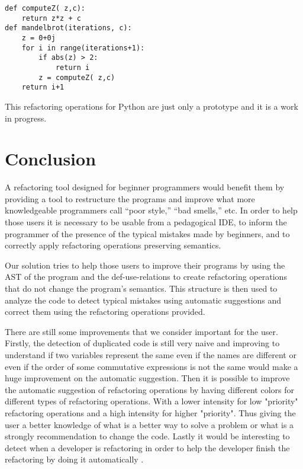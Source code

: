 \begin{lstlisting}
def computeZ( z,c):
    return z*z + c
def mandelbrot(iterations, c):
    z = 0+0j
    for i in range(iterations+1):
        if abs(z) > 2:
            return i
        z = computeZ( z,c)
    return i+1
\end{lstlisting}

This refactoring operations for Python are just only a prototype and it is a work
in progress.
\section{Conclusion}
A refactoring tool designed for beginner programmers would benefit them
by providing a tool to restructure the programs and improve what more knowledgeable programmers call ``poor style,''
``bad smells,'' etc.
In order to help those users it is necessary to be usable from a pedagogical IDE,
to inform the programmer of the presence of the typical mistakes made by beginners, and
to correctly apply refactoring operations preserving semantics.

Our solution tries to help those users to improve their programs by using the AST of
the program and the def-use-relations to create refactoring operations that do not
change the program's semantics. This structure is then used to analyze the code
to detect typical mistakes using automatic suggestions and correct them using the
refactoring operations provided.


There are still some improvements that we consider important for the user.
Firstly, the detection of duplicated code is still very naive and improving to understand if
two variables represent the same even if the names are different or even if the
 order of some commutative expressions is not the same would make a huge improvement
 on the automatic suggestion.
Then it is possible to improve the automatic suggestion of refactoring operations by
having different colors for different types of refactoring operations.
With a lower intensity for low "priority" refactoring operations and a high intensity
for higher "priority". Thus giving the user a better knowledge of what is a better
way to solve a problem or what is a strongly recommendation to change the code.
Lastly it would be interesting to detect when a developer is refactoring in order to help the developer finish the
refactoring by doing it automatically \cite{ge2012reconciling}.
